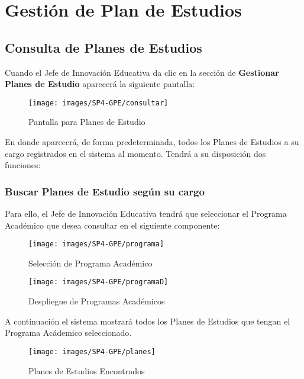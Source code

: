 
\chapter{Gestión de Plan de Estudios}
\section{Consulta de Planes de Estudios}
Cuando el Jefe de Innovación Educativa da clic en la sección de \textbf{Gestionar Planes de Estudio} aparecerá la siguiente pantalla:


\begin{figure}[!hbtp]
	\centering
	\hypertarget{consultarPE}{\texttt{[image: images/SP4-GPE/consultar]}}
	\caption{Pantalla para Planes de Estudio}
	\label{consultarPE}
\end{figure}

En donde aparecerá, de forma predeterminada, todos los Planes de Estudios a su cargo registrados en el sistema al momento. Tendrá a su disposición dos funciones:

\subsection{Buscar Planes de Estudio según su cargo}

Para ello, el Jefe de Innovación Educativa tendrá que seleccionar el Programa Académico que desea consultar en el siguiente componente:

\begin{figure}[!hbtp]
	\centering
	\hypertarget{academico}{\texttt{[image: images/SP4-GPE/programa]}}
	\caption{Selección de Programa Académico}
	\label{academico}
\end{figure}

\begin{figure}[!hbtp]
	\centering
	\hypertarget{academico2}{\texttt{[image: images/SP4-GPE/programaD]}}
	\caption{Despliegue de Programas Académicos}
	\label{academico2}
\end{figure}

A continuación el sistema mostrará todos los Planes de Estudios que tengan el Programa Acádemico seleccionado.
\begin{figure}[!hbtp]
	\centering
	\hypertarget{planes}{\texttt{[image: images/SP4-GPE/planes]}}
	\caption{Planes de Estudios Encontrados}
	\label{planes}
\end{figure}
\newpage

